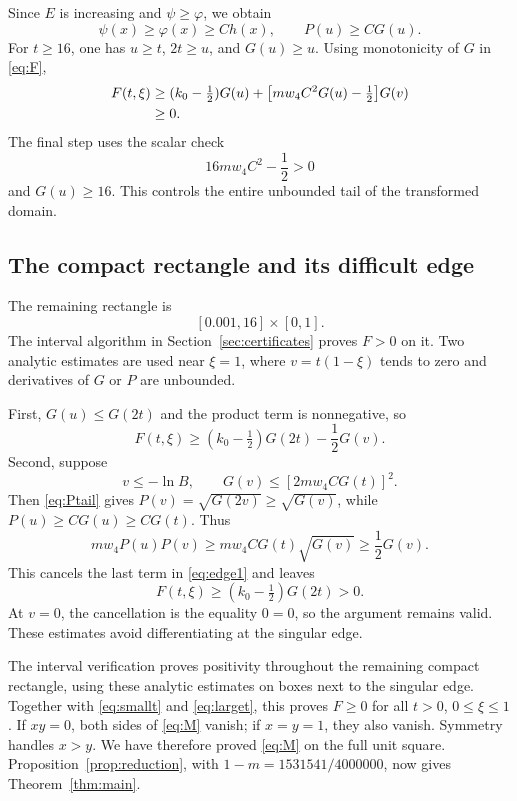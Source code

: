 \documentclass[11pt]{article}
\theoremstyle{remark}
\begin{document}
Since \(E\) is increasing and \(\psi\ge\varphi\), we obtain
\[
\psi(x)\ge\varphi(x)\ge Ch(x),\qquad
P(u)\ge CG(u).
\]
For \(t\ge16\), one has \(u\ge t\), \(2t\ge u\), and \(G(u)\ge u\).
Using monotonicity of \(G\) in \eqref{eq:F},
\begin{align}
F(t,\xi)
&\ge (k_0-\tfrac12)G(u)
+\bigl[mw_4C^2G(u)-\tfrac12\bigr]G(v)\notag\\
&\ge0. \label{eq:larget}
\end{align}
The final step uses the scalar check
\[
16mw_4C^2-\frac12>0
\]
and \(G(u)\ge16\). This controls the entire unbounded tail of the
transformed domain.

\subsection{The compact rectangle and its difficult edge}
The remaining rectangle is
\[
[0.001,16]\times[0,1].
\]
The interval algorithm in Section~\ref{sec:certificates} proves
\(F>0\) on it. Two analytic estimates are used near \(\xi=1\),
where \(v=t(1-\xi)\) tends to zero and derivatives of \(G\) or
\(P\) are unbounded.

First, \(G(u)\le G(2t)\) and the product term is nonnegative, so
\begin{equation}\label{eq:edge1}
F(t,\xi)\ge(k_0-\tfrac12)G(2t)-\frac12G(v).
\end{equation}
Second, suppose
\begin{equation}\label{eq:edge-condition}
v\le-\ln B,\qquad G(v)\le[2mw_4CG(t)]^2.
\end{equation}
Then \eqref{eq:Ptail} gives
\(P(v)=\sqrt{G(2v)}\ge\sqrt{G(v)}\), while
\(P(u)\ge CG(u)\ge CG(t)\). Thus
\[
mw_4P(u)P(v)\ge mw_4CG(t)\sqrt{G(v)}
\ge \frac12G(v).
\]
This cancels the last term in \eqref{eq:edge1} and leaves
\begin{equation}\label{eq:edge2}
F(t,\xi)\ge(k_0-\tfrac12)G(2t)>0.
\end{equation}
At \(v=0\), the cancellation is the equality \(0=0\), so the
argument remains valid. These estimates avoid differentiating at
the singular edge.

The interval verification proves positivity throughout the remaining
compact rectangle, using these analytic estimates on boxes next to
the singular edge.
Together with \eqref{eq:smallt} and \eqref{eq:larget}, this proves
\(F\ge0\) for all \(t>0\), \(0\le\xi\le1\).
If \(xy=0\), both sides of \eqref{eq:M} vanish; if \(x=y=1\),
they also vanish. Symmetry handles \(x>y\).
We have therefore proved \eqref{eq:M} on the full unit square.
Proposition~\ref{prop:reduction}, with \(1-m=1531541/4000000\), now gives
Theorem~\ref{thm:main}.
\end{document}
